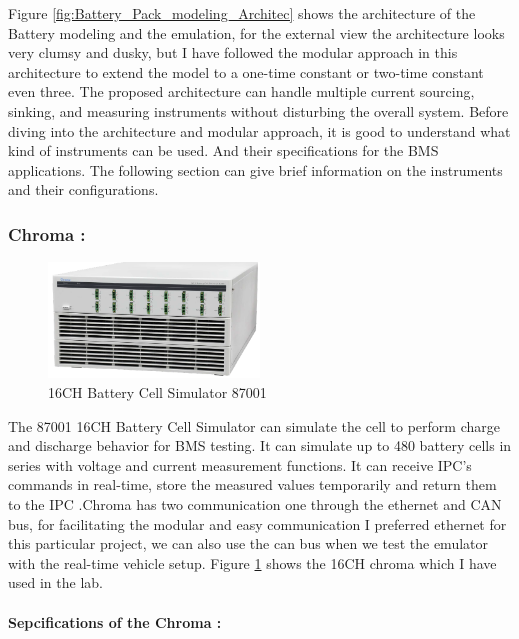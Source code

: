 Figure \ref{fig:Battery_Pack_modeling_Architec} shows the architecture of the Battery modeling and the emulation, for the external view the architecture looks very clumsy and dusky, but I have followed the modular approach in this architecture to extend the model to a one-time constant or two-time constant even three. The proposed architecture can handle multiple current sourcing, sinking, and measuring instruments without disturbing the overall system. Before diving into the architecture and modular approach, it is good to understand what kind of instruments can be used. And their specifications for the BMS applications. The following section can give brief information on the instruments and their configurations.

\subsubsection{Chroma :}
\begin{figure}[h]
	\centering
	\includegraphics[width=0.5\textwidth]{Chap06/Figures/Chroma.PNG}
	\caption{16CH Battery Cell Simulator 87001}
	\label{fig:Chroma}
\end{figure}
The 87001 16CH Battery Cell Simulator can simulate the cell to perform charge and discharge behavior for BMS testing. It can simulate up to 480 battery cells in series with voltage and current measurement functions. It can receive IPC's commands in real-time, store the measured values temporarily and return them to the IPC \cite{Chroma_UserManual}.Chroma has two communication one through the ethernet and CAN bus, for facilitating the modular and easy communication I preferred ethernet for this particular project, we can also use the can bus when we test the emulator with the real-time vehicle setup. Figure \ref{fig:Chroma} shows the 16CH chroma which I have used in the lab.

\paragraph{Sepcifications of the Chroma :}

